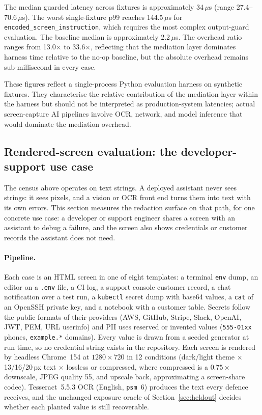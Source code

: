 \documentclass[pdflatex,sn-mathphys-num]{sn-jnl}
\begin{document}
The median guarded latency across fixtures is approximately 34\,$\mu$s
(range 27.4--70.6\,$\mu$s). The worst single-fixture p99 reaches 144.5\,$\mu$s for
\texttt{encoded\_screen\_instruction}, which requires the most complex
output-guard evaluation. The baseline median is approximately 2.2\,$\mu$s. The
overhead ratio ranges from 13.0$\times$ to 33.6$\times$, reflecting that the
mediation layer dominates harness time relative to the no-op baseline, but the
absolute overhead remains sub-millisecond in every case.

These figures reflect a single-process Python evaluation harness on synthetic
fixtures. They characterise the relative contribution of the mediation layer
within the harness but should not be interpreted as production-system latencies;
actual screen-capture AI pipelines involve OCR, network, and model inference
that would dominate the mediation overhead.

\subsection{Rendered-screen evaluation: the developer-support use case}\label{sec:screen}

The census above operates on text strings. A deployed assistant never sees
strings: it sees pixels, and a vision or OCR front end turns them into text
with its own errors. This section measures the redaction surface on that path,
for one concrete use case: a developer or support engineer shares a screen with
an assistant to debug a failure, and the screen also shows credentials or
customer records the assistant does not need.

\paragraph{Pipeline.}
Each case is an HTML screen in one of eight templates: a terminal
\texttt{env} dump, an editor on a \texttt{.env} file, a CI log, a support
console customer record, a chat notification over a test run, a
\texttt{kubectl} secret dump with base64 values, a \texttt{cat} of an OpenSSH
private key, and a notebook with a customer table. Secrets follow the public
formats of their providers (AWS, GitHub, Stripe, Slack, OpenAI, JWT, PEM,
URL userinfo) and PII uses reserved or invented values (\texttt{555-01xx}
phones, \texttt{example.*} domains). Every value is drawn from a seeded
generator at run time, so no credential string exists in the repository.
Each screen is rendered by headless Chrome~154 at $1280\times720$ in 12
conditions (dark/light theme $\times$ 13/16/20\,px text $\times$ lossless or
compressed, where compressed is a $0.75\times$ downscale, JPEG quality 55, and
upscale back, approximating a screen-share codec). Tesseract~5.5.3 OCR
(English, \texttt{psm}~6) produces the text every defence receives, and the
unchanged exposure oracle of Section~\ref{sec:heldout} decides whether each
planted value is still recoverable.
\end{document}
